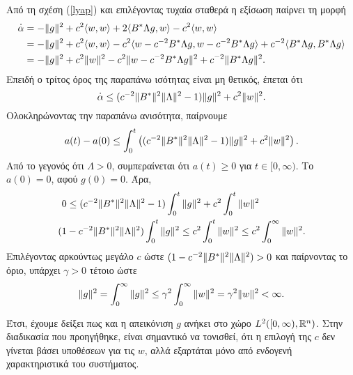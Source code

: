 Από τη σχέση (\ref{lyap}) και επιλέγοντας τυχαία σταθερά  η εξίσωση 
παίρνει τη μορφή
\begin{align*}
\overset{\bm.}{\alpha}& = -\|g\|_{} ^2 + c^2\langle w, w\rangle + 2\langle B^* \Lambda g,w
    \rangle    - c^2\langle w, w\rangle\\
    & = -\|g\|_{} ^2 + c^2\langle w, w\rangle -c^2\langle w - 
    c^{-2}B^* \Lambda g,w -c^{-2} B^* \Lambda g\rangle  
    +c^{-2}\langle B^* \Lambda g,B^* \Lambda g\rangle\\
    & = -\|g\|_{} ^2 + c^2\|w\|_{}^2 -c^2\|w - c^{-2}B^* \Lambda g\|_{}^2  
    +c^{-2} \|B^* \Lambda g\|_{}^2.
\end{align*}
Επειδή ο τρίτος όρος της παραπάνω ισότητας είναι μη θετικός, έπεται ότι
\[\overset{\bm.}{\alpha}  \le   (c^{-2}\|B^*\|_{}^2 \|\Lambda\|_{}^2  -1) \|g\|_{} ^2+ 
    c^2 \|w\|_{} ^2. \]
Ολοκληρώνοντας την παραπάνω ανισότητα, παίρνουμε
\[   a(t) - a(0) \le \int_{0}^{t} \left((c^{-2}\|B^*\|_{}^2 \|\Lambda\|_{}^2  -1) 
    \|g\|_{} ^2+ c^2 \|w\|_{} ^2 \right).\]
Από το γεγονός ότι $\Lambda > 0$, συμπεραίνεται ότι $a(t) \ge 0$ για  
$t\in[0,\infty)$. Το $a(0) = 0$, αφού $g(0) = 0$. Άρα,
\begin{align*}
    0 &\le (c^{-2}\|B^*\|_{}^2 \|\Lambda\|_{}^2  -1) \int_{0}^{t} \|g\|_{} ^2
    + c^2 \int_{0}^{t} \|w\|_{} ^2 \\
    (1& - c^{-2}\|B^*\|_{}^2 \|\Lambda\|_{}^2) \int_{0}^{t} \|g\|_{} ^2 \le c^2 
    \int_{0}^{t} \|w\|_{} ^2 \le c^2 \int_0^\infty \|w\|_{}^2.
\end{align*}
Επιλέγοντας αρκούντως μεγάλο $c$ ώστε $(1 - c^{-2}\|B^*\|_{}^2\|\Lambda\|_{}^2)
 >0$ και παίρνοντας το όριο, υπάρχει $\gamma>0$ τέτοιο ώστε
 \[\|g\|_{}^2 = \int_0^\infty \|g\|_{}^2 \le \gamma^2 \int_0^\infty \|w\|_{}^2 = 
 \gamma^2 \|w\|_{}^2 < \infty.\]

Έτσι, έχουμε δείξει πως και η απεικόνιση $g$ ανήκει στο χώρο $L^2([0, \infty), 
\mathbb{R}^{n})$. Στην διαδικασία που προηγήθηκε, είναι σημαντικό να τονισθεί, ότι η 
επιλογή της $c$ δεν γίνεται βάσει υποθέσεων για τις $w$, αλλά εξαρτάται μόνο από
ενδογενή χαρακτηριστικά του συστήματος. 

